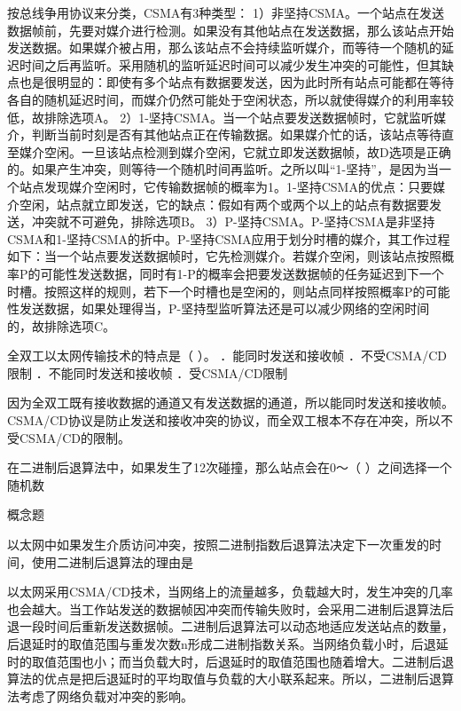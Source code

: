 \begin{solution}按总线争用协议来分类，CSMA有3种类型：
1）非坚持CSMA。一个站点在发送数据帧前，先要对媒介进行检测。如果没有其他站点在发送数据，那么该站点开始发送数据。如果媒介被占用，那么该站点不会持续监听媒介，而等待一个随机的延迟时间之后再监听。采用随机的监听延迟时间可以减少发生冲突的可能性，但其缺点也是很明显的：即使有多个站点有数据要发送，因为此时所有站点可能都在等待各自的随机延迟时间，而媒介仍然可能处于空闲状态，所以就使得媒介的利用率较低，故排除选项A。
2）1-坚持CSMA。当一个站点要发送数据帧时，它就监听媒介，判断当前时刻是否有其他站点正在传输数据。如果媒介忙的话，该站点等待直至媒介空闲。一旦该站点检测到媒介空闲，它就立即发送数据帧，故D选项是正确的。如果产生冲突，则等待一个随机时间再监听。之所以叫``1-坚持''，是因为当一个站点发现媒介空闲时，它传输数据帧的概率为1。1-坚持CSMA的优点：只要媒介空闲，站点就立即发送，它的缺点：假如有两个或两个以上的站点有数据要发送，冲突就不可避免，排除选项B。
3）P-坚持CSMA。P-坚持CSMA是非坚持CSMA和1-坚持CSMA的折中。P-坚持CSMA应用于划分时槽的媒介，其工作过程如下：当一个站点要发送数据帧时，它先检测媒介。若媒介空闲，则该站点按照概率P的可能性发送数据，同时有1-P的概率会把要发送数据帧的任务延迟到下一个时槽。按照这样的规则，若下一个时槽也是空闲的，则站点同样按照概率P的可能性发送数据，如果处理得当，P-坚持型监听算法还是可以减少网络的空闲时间的，故排除选项C。
\end{solution}
\question 全双工以太网传输技术的特点是（ ）。 ．能同时发送和接收帧
．不受CSMA/CD限制 ．不能同时发送和接收帧 ．受CSMA/CD限制
\par{}
\begin{solution}因为全双工既有接收数据的通道又有发送数据的通道，所以能同时发送和接收帧。CSMA/CD协议是防止发送和接收冲突的协议，而全双工根本不存在冲突，所以不受CSMA/CD的限制。
\end{solution}
\question 在二进制后退算法中，如果发生了12次碰撞，那么站点会在0～（
）之间选择一个随机数
\par{}
\begin{solution}概念题
\end{solution}
\question 以太网中如果发生介质访问冲突，按照二进制指数后退算法决定下一次重发的时间，使用二进制后退算法的理由是
\par{}
\begin{solution}以太网采用CSMA/CD技术，当网络上的流量越多，负载越大时，发生冲突的几率也会越大。当工作站发送的数据帧因冲突而传输失败时，会采用二进制后退算法后退一段时间后重新发送数据帧。二进制后退算法可以动态地适应发送站点的数量，后退延时的取值范围与重发次数n形成二进制指数关系。当网络负载小时，后退延时的取值范围也小；而当负载大时，后退延时的取值范围也随着增大。二进制后退算法的优点是把后退延时的平均取值与负载的大小联系起来。所以，二进制后退算法考虑了网络负载对冲突的影响。
\end{solution}
